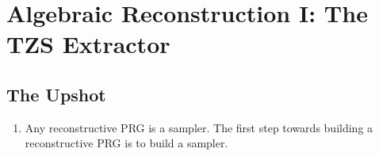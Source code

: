 \chapter{Algebraic Reconstruction I: The TZS Extractor}

\section*{The Upshot}

\begin{enumerate}
  \item Any reconstructive PRG is a sampler. The first step towards building a
    reconstructive PRG is to build a sampler.
\end{enumerate}
